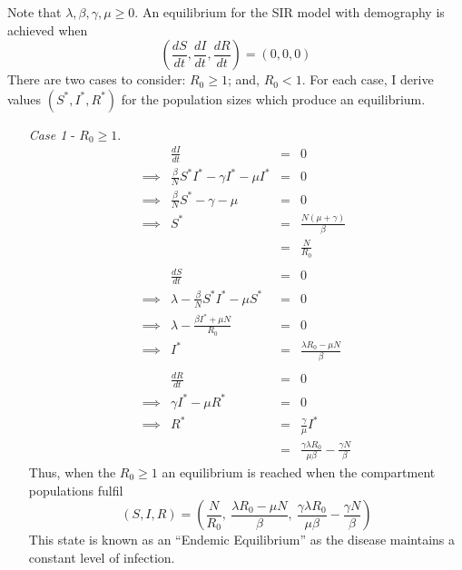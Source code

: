 \documentclass[11pt,a4paper]{article}
\theoremstyle{break}
\begin{document}
  \begin{box_remark}\label{rem_equilibria_sir_w_demography}
    Note that $\lambda,\beta,\gamma,\mu\geq0$. An equilibrium for the SIR model with demography is achieved when
    \[ \left(\frac{dS}{dt},\frac{dI}{dt},\frac{dR}{dt}\right)=(0,0,0) \]
    There are two cases to consider: $R_0\geq 1$; and, $R_0<1$. For each case, I derive values $(S^*,I^*,R^*)$ for the population sizes which produce an equilibrium.
    \begin{itemize}
      \item[\textit{Case 1}] - $R_0\geq1$.
      \[\begin{array}{rrcl}
        &\frac{dI}{dt}&=&0\\
        \implies&\frac{\beta}N S^*I^*-\gamma I^*-\mu I^*&=&0\\
        \implies&\frac{\beta}N S^*-\gamma-\mu&=&0\\
        \implies&S^*&=&\frac{N(\mu+\gamma)}\beta\\
        &&=&\frac{N}{R_0}\\
        \\
        &\frac{dS}{dt}&=&0\\
        \implies&\lambda-\frac\beta{N} S^*I^*-\mu S^*&=&0\\
        \implies&\lambda-\frac{\beta I^*+\mu N}{R_0}&=&0\\
        \implies&I^*&=&\frac{\lambda R_0-\mu N}\beta\\
        \\
        &\frac{dR}{dt}&=&0\\
        \implies&\gamma I^*-\mu R^*&=&0\\
        \implies&R^*&=&\frac\gamma\mu I^*\\
        &&=&\frac{\gamma\lambda R_0}{\mu\beta}-\frac{\gamma N}\beta
      \end{array}\]
      Thus, when the $R_0\geq1$ an equilibrium is reached when the compartment populations fulfil
      \[ (S,I,R)=\left(\frac{N}{R_0},\ \frac{\lambda R_0-\mu N}\beta,\ \frac{\gamma\lambda R_0}{\mu\beta}-\frac{\gamma N}\beta\right) \]
      This state is known as an ``Endemic Equilibrium'' as the disease maintains a constant level of infection.


\end{itemize}
\end{box_remark}
\end{document}
